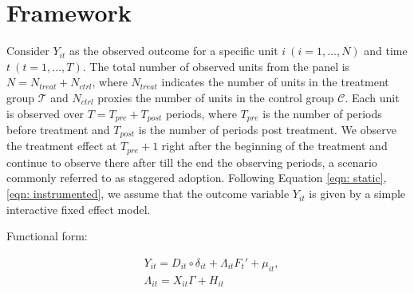 \documentclass[12pt]{article}
\begin{document}
\section{Framework} 
\label{sec: framework}

Consider $Y_{it}$ as the observed outcome for a specific unit $i \ (i = 1, \dots, N)$ and time $t \ (t = 1, \dots, T)$. The total number of observed units from the panel is $N = N_{treat} + N_{ctrl}$, where $N_{treat}$ indicates the number of units in the treatment group $\mathcal{T}$ and $N_{ctrl}$ proxies the number of units in the control group $\mathcal{C}$. Each unit is observed over $T = T_{pre} + T_{post}$ periods, where $T_{pre}$ is the number of periods before treatment and $T_{post}$ is the number of periods post treatment. We observe the treatment effect at $T_{pre} + 1$ right after the beginning of the treatment and continue to observe there after till the end the observing periods, a scenario commonly referred to as staggered adoption. Following Equation \ref{eqn: static}, \ref{eqn: instrumented}, we assume that the outcome variable $Y_{it}$ is given by a simple interactive fixed effect model.

\begin{assumption}
Functional form:
\label{ass: function}
\end{assumption}

\begin{equation}
\begin{aligned}
& Y_{it} = D_{it} \circ \delta_{it} + \Lambda_{it}F_{t}' + \mu_{it}, \\
& \Lambda_{it} = X_{it}\Gamma + H_{it}
\end{aligned}
\label{eqn: functional form}
\end{equation}
\end{document}
